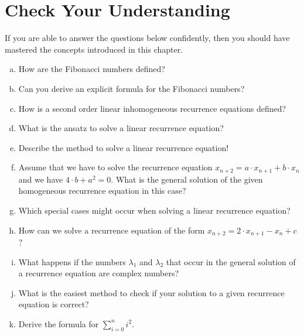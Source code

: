 \section{Check Your Understanding}
If you are able to answer the questions below confidently, then you should have mastered the concepts
introduced in this chapter.
\begin{enumerate}[(a)]
\item How are the Fibonacci numbers defined?
\item Can you derive an explicit formula for the Fibonacci numbers?
\item How is a second order linear inhomogeneous recurrence equations defined?  
\item What is the ansatz to solve a linear  recurrence equation?
\item Describe the method to solve a linear  recurrence equation!
\item Assume that we have to solve the recurrence equation $x_{n+2} = a \cdot x_{n+1} + b \cdot x_n$
      and we have $4 \cdot b + a^2 = 0$.  What is the general solution of the given homogeneous
      recurrence equation in this case?
\item Which special cases might occur when solving a linear recurrence equation?
\item How can we solve a recurrence equation of the form $x_{n+2} = 2 \cdot x_{n+1} - x_n + c$?
\item What happens if the numbers $\lambda_1$ and $\lambda_2$ that occur in the general solution
      of a recurrence equation are complex numbers?
\item What is the easiest method to check if your solution to a given recurrence equation is correct?  
\item Derive the formula for $\sum\limits_{i=0}^n i^2$.
\end{enumerate}


